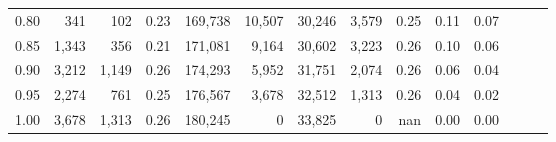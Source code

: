 \begin{tabular}{rrrrrrrrrrrrrr}
0.80 &     341 &    102 &  0.23 &  169,738 &   10,507 &  30,246 &   3,579 &  0.25 &  0.11 &      0.07 \\
0.85 &   1,343 &    356 &  0.21 &  171,081 &    9,164 &  30,602 &   3,223 &  0.26 &  0.10 &      0.06 \\
0.90 &   3,212 &  1,149 &  0.26 &  174,293 &    5,952 &  31,751 &   2,074 &  0.26 &  0.06 &      0.04 \\
0.95 &   2,274 &    761 &  0.25 &  176,567 &    3,678 &  32,512 &   1,313 &  0.26 &  0.04 &      0.02 \\
1.00 &   3,678 &  1,313 &  0.26 &  180,245 &        0 &  33,825 &       0 &   nan &  0.00 &      0.00 \\
\bottomrule
\end{tabular}
